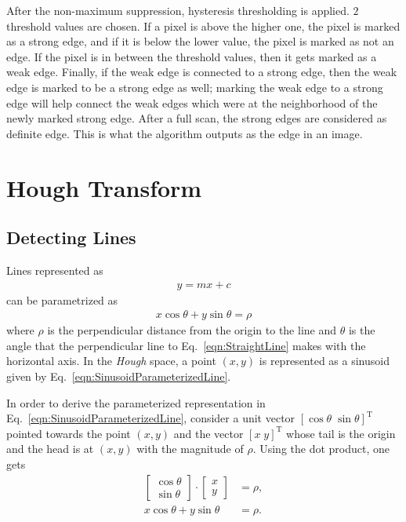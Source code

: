 \documentclass{report}
\begin{document}
After the non-maximum suppression, hysteresis thresholding is applied. $2$ threshold values are chosen. If a pixel is above the higher one, the pixel is marked as a strong edge, and if it is below the lower value, the pixel is marked as not an edge. If the pixel is in between the threshold values, then it gets marked as a weak edge. Finally, if the weak edge is connected to a strong edge, then the weak edge is marked to be a strong edge as well; marking the weak edge to a strong edge will help connect the weak edges which were at the neighborhood of the newly marked strong edge. After a full scan, the strong edges are considered as definite edge. This is what the algorithm outputs as the edge in an image.

\section{Hough Transform}
\subsection{Detecting Lines}
\hspace{\parindent}Lines represented as 
\begin{align}
	y = mx + c
	\label{eqn:StraightLine}
\end{align}
can be parametrized as
\begin{align}
	x \cos{\theta} + y \sin{\theta} = \rho
	\label{eqn:SinusoidParameterizedLine}
\end{align}
where $\rho$ is the perpendicular distance from the origin to the line and $\theta$ is the angle that the perpendicular line to Eq.~\ref{eqn:StraightLine} makes with the horizontal axis. In the \textit{Hough} space, a point $(x,y)$ is represented as a sinusoid given by Eq.~\ref{eqn:SinusoidParameterizedLine}.

In order to derive the parameterized representation in Eq.~\ref{eqn:SinusoidParameterizedLine}, consider a unit vector $[ \cos{\theta} \; \sin{\theta} ]^\text{T}$ pointed towards the point $(x, y)$ and the vector $[x \; y]^{\text{T}}$ whose tail is the origin and the head is at $(x,y)$ with the magnitude of $\rho$. Using the dot product, one gets
\begin{align}
	\begin{bmatrix}
		\cos{\theta} \\
		\sin{\theta}
	\end{bmatrix}
	\cdot
	\begin{bmatrix}
		x \\
		y
	\end{bmatrix}
	& = \rho, \\
	x \cos{\theta} + y \sin{\theta} & = \rho.
	\label{eqn:SinusoidParameterizedLineDerivation}
\end{align}
\end{document}
